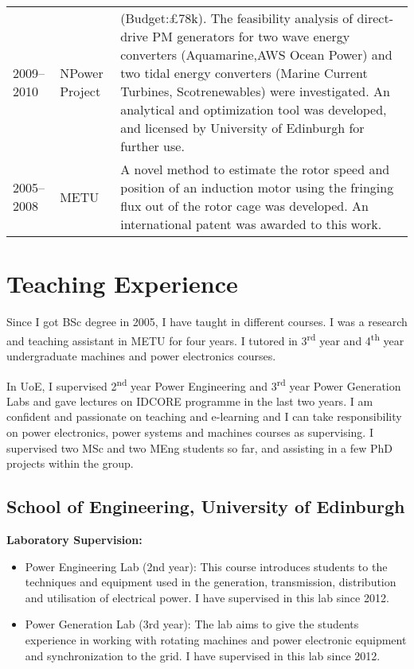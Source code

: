 \documentclass[a4paper,12pt]{article}
\begin{document}
\begin{longtable}{lp{3cm}p{12cm}}
2009--2010 & NPower Project & (Budget:£78k). The feasibility analysis of direct-drive PM generators for two wave energy converters (Aquamarine,AWS Ocean Power) and two tidal energy converters (Marine Current Turbines, Scotrenewables) were investigated. An analytical and optimization tool was developed, and licensed by University of Edinburgh for further use.\\
2005--2008 & METU & A novel method to estimate the rotor speed and position of an induction motor using the fringing flux out of the rotor cage was developed. An international patent was awarded to this work.\\
\end{longtable}

\clearpage

\section{Teaching Experience}

Since I got BSc degree in 2005, I have taught in different courses. I was a research and teaching assistant in METU for four years. I tutored in 3\textsuperscript{rd} year and 4\textsuperscript{th} year undergraduate machines and power electronics courses.

In UoE, I supervised 2\textsuperscript{nd} year Power Engineering and 3\textsuperscript{rd} year Power Generation Labs and gave lectures on IDCORE programme in the last two years. I am confident and passionate on teaching and e-learning and I can take responsibility on power electronics, power systems and machines courses as supervising. I supervised two MSc and two MEng students so far, and assisting in a few PhD projects within the group.

\subsection{School of Engineering, University of Edinburgh}

\textbf{Laboratory Supervision:}
\begin{itemize}
\item Power Engineering Lab (2nd year): This course introduces students to the techniques and equipment used in the generation, transmission, distribution and utilisation of electrical power. I have supervised in this lab since 2012.
\item Power Generation Lab (3rd year): The lab aims to give the students experience in working with rotating machines and power electronic equipment and synchronization to the grid. I have supervised in this lab since 2012.

\end{itemize}
\end{document}
